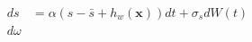 \begin{align}
    ds &= \alpha(s-\bar{s}+h_w(\mathbf x)) dt + \sigma_s dW(t) \\
    d\omega
\end{align}